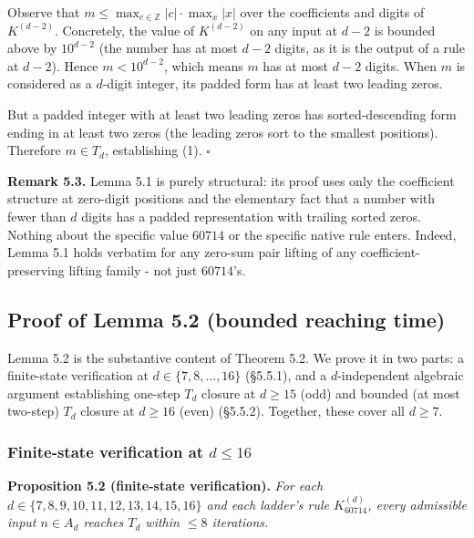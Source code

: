 \documentclass[11pt,letterpaper]{article}
\theoremstyle{paperstyle}
\theoremstyle{paperstyledef}
\theoremstyle{paperstylerem}
\begin{document}
Observe that \(m \leq \max_{c \in \mathbb{Z}} |c| \cdot \max_x |x|\)
over the coefficients and digits of \(K^{(d-2)}\). Concretely, the value
of \(K^{(d-2)}\) on any input at \(d - 2\) is bounded above by
\(10^{d-2}\) (the number has at most \(d - 2\) digits, as it is the
output of a rule at \(d - 2\)). Hence \(m < 10^{d - 2}\), which means
\(m\) has at most \(d - 2\) digits. When \(m\) is considered as a
\(d\)-digit integer, its padded form has at least two leading zeros.

But a padded integer with at least two leading zeros has
sorted-descending form ending in at least two zeros (the leading zeros
sort to the smallest positions). Therefore \(m \in T_d\), establishing
(1). \(\square\)

\textbf{Remark 5.3.} Lemma 5.1 is purely structural: its proof uses only
the coefficient structure at zero-digit positions and the elementary
fact that a number with fewer than \(d\) digits has a padded
representation with trailing sorted zeros. Nothing about the specific
value \(60714\) or the specific native rule enters. Indeed, Lemma 5.1
holds verbatim for any zero-sum pair lifting of any
coefficient-preserving lifting family - not just \(60714\)'s.

\hypertarget{proof-of-lemma-5.2-bounded-reaching-time}{%
\subsection{Proof of Lemma 5.2 (bounded reaching time)}\label{proof-of-lemma-5.2-bounded-reaching-time}}

Lemma 5.2 is the substantive content of Theorem 5.2. We prove it in two
parts: a finite-state verification at \(d \in \{7, 8, \ldots, 16\}\)
(§5.5.1), and a \(d\)-independent algebraic argument establishing
one-step \(T_d\) closure at \(d \geq 15\) (odd) and bounded (at most
two-step) \(T_d\) closure at \(d \geq 16\) (even) (§5.5.2). Together,
these cover all \(d \geq 7\).

\hypertarget{finite-state-verification-at-d-leq-16}{%
\subsubsection{\texorpdfstring{Finite-state verification at \(d \leq 16\)}{Finite-state verification at d \textbackslash leq 16}}\label{finite-state-verification-at-d-leq-16}}

\textbf{Proposition 5.2 (finite-state verification).} \emph{For each
\(d \in \{7, 8, 9, 10, 11, 12, 13, 14, 15, 16\}\) and each ladder's rule
\(K_{60714}^{(d)}\), every admissible input \(n \in A_d\) reaches
\(T_d\) within \(\leq 8\) iterations.}
\end{document}

